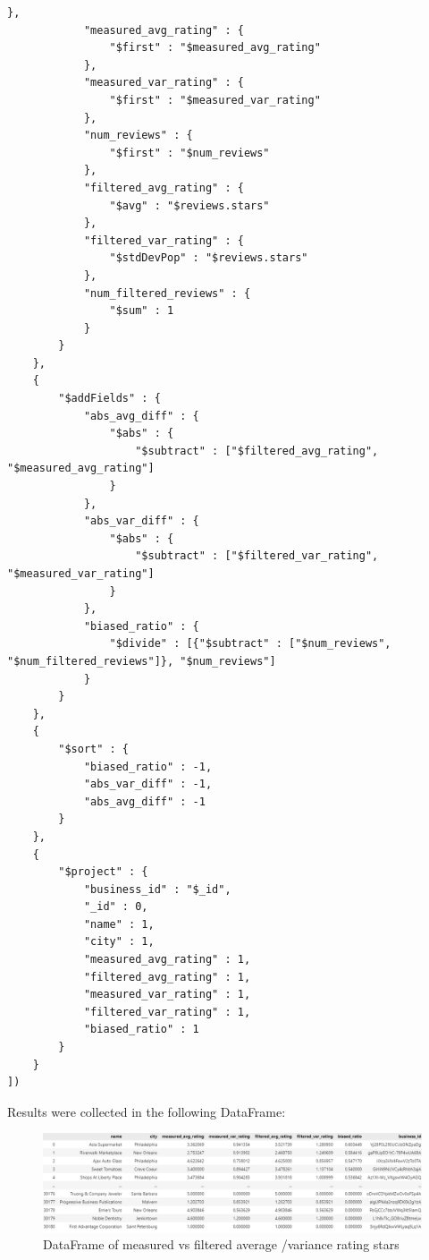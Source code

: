\documentclass{Configuration_Files/PoliMi3i_thesis}
\begin{document}
\begin{lstlisting}[style = mongodb]
            },
            "measured_avg_rating" : {
                "$first" : "$measured_avg_rating"
            },
            "measured_var_rating" : {
                "$first" : "$measured_var_rating"
            },
            "num_reviews" : {
                "$first" : "$num_reviews"
            },
            "filtered_avg_rating" : {
                "$avg" : "$reviews.stars"
            },
            "filtered_var_rating" : {
                "$stdDevPop" : "$reviews.stars"
            },
            "num_filtered_reviews" : {
                "$sum" : 1
            }
        }
    },
    {
        "$addFields" : {
            "abs_avg_diff" : {
                "$abs" : {
                    "$subtract" : ["$filtered_avg_rating", "$measured_avg_rating"]
                }
            },
            "abs_var_diff" : {
                "$abs" : {
                    "$subtract" : ["$filtered_var_rating", "$measured_var_rating"]
                }
            },
            "biased_ratio" : {
                "$divide" : [{"$subtract" : ["$num_reviews", "$num_filtered_reviews"]}, "$num_reviews"]
            }
        }
    },
    {
        "$sort" : {
            "biased_ratio" : -1,
            "abs_var_diff" : -1,
            "abs_avg_diff" : -1
        }
    },
    {
        "$project" : {
            "business_id" : "$_id",
            "_id" : 0,
            "name" : 1,
            "city" : 1,
            "measured_avg_rating" : 1,
            "filtered_avg_rating" : 1,
            "measured_var_rating" : 1,
            "filtered_var_rating" : 1,
            "biased_ratio" : 1
        }
    }
])    
\end{lstlisting}

\bigskip

Results were collected in the following DataFrame:

\bigskip

\begin{figure}[H]
    \centering
    \includegraphics[width=\columnwidth]{imgs/query_11b.png}
    \caption{DataFrame of measured vs filtered average /variance rating stars}
    \label{fig:query_11b}
\end{figure}
\end{document}
